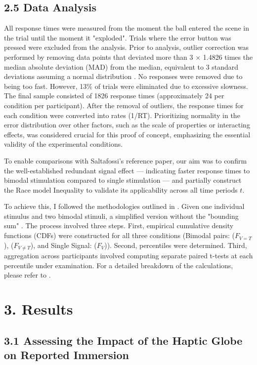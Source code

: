 \documentclass[12pt,oneside,openright]{report}
\begin{document}
\subsection*{2.5 Data Analysis}

All response times were measured from the moment the ball entered the scene in the trial until the moment it "exploded". Trials where the error button was pressed were excluded from the analysis. Prior to analysis, outlier correction was performed by removing data points that deviated more than 3 × 1.4826 times the median absolute deviation (MAD) from the median, equivalent to 3 standard deviations assuming a normal distribution \parencite{Innes2019ACA}. No responses were removed due to being too fast. However, 13\% of trials were eliminated due to excessive slowness. The final sample consisted of 1826 response times (approximately 24 per condition per participant). After the removal of outliers, the response times for each condition were converted into rates (1/RT). Prioritizing normality in the error distribution over other factors, such as the scale of properties or interacting effects, was considered crucial for this proof of concept, emphasizing the essential validity of the experimental conditions. 

To enable comparisons with Saltafossi's reference paper, our aim was to confirm the well-established redundant signal effect — indicating faster response times to bimodal stimulation compared to single stimulation — and partially construct the Race model Inequality to validate its applicability across all time periods $t$.

To achieve this, I followed the methodologies outlined in \cite{Ulrich2007,Innes2019ACA}. Given one individual stimulus and two bimodal stimuli, a simplified version without the "bounding sum" . The process involved three steps. First, empirical cumulative density functions (CDFs) were constructed for all three conditions (Bimodal pairs: ($F_{V=T}$), ($F_{V \neq T}$), and Single Signal: ($F_V$)). Second, percentiles were determined. Third, aggregation across participants involved computing separate paired t-tests at each percentile under examination. For a detailed breakdown of the calculations, please refer to \cite{Ulrich2007}.

\section*{3. Results}
\subsection*{3.1 Assessing the Impact of the Haptic Globe on Reported Immersion}
    
\end{document}
